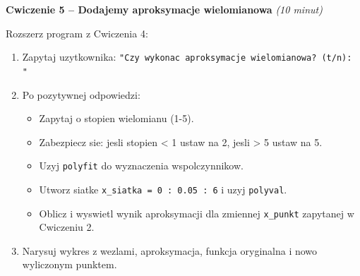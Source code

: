 \documentclass[12pt,a4paper]{article}
\begin{document}
	\newpage
	\begin{cwiczeniebox}
		\textbf{Cwiczenie 5 -- Dodajemy aproksymacje wielomianowa} \quad \textit{(10 minut)}
		
		Rozszerz program z Cwiczenia 4:
		
		\begin{enumerate}[leftmargin=*,itemsep=2pt]
			\item Zapytaj uzytkownika: \texttt{"Czy wykonac aproksymacje wielomianowa? (t/n): "}
			\item Po pozytywnej odpowiedzi:
			\begin{itemize}
				\item Zapytaj o stopien wielomianu (1-5).
				\item Zabezpiecz sie: jesli stopien < 1 ustaw na 2, jesli > 5 ustaw na 5.
				\item Uzyj \texttt{polyfit} do wyznaczenia wspolczynnikow.
				\item Utworz siatke \texttt{x\_siatka = 0 : 0.05 : 6} i uzyj \texttt{polyval}.
				\item Oblicz i wyswietl wynik aproksymacji dla zmiennej \texttt{x\_punkt} zapytanej w Cwiczeniu 2.
			\end{itemize}
			\item Narysuj wykres z wezlami, aproksymacja, funkcja oryginalna i nowo wyliczonym punktem.
		\end{enumerate}
	\end{cwiczeniebox}
	
\end{document}
